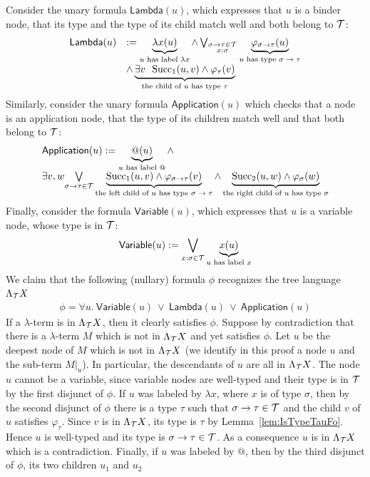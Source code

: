 Consider the unary formula $\mathsf{Lambda}(u)$, which expresses that $u$ is a binder node, that its type and the type of its child match well and both belong to ${\mathcal T}$: 
$$\begin{array}{ll}
\mathsf{Lambda}(u) &:= \underbrace{\lambda x(u)}_{\substack{\text{$u$ has label $\lambda x$}}} \wedge\bigvee_{\substack{\sigma\rightarrow\tau \in {\mathcal T}\\x:\sigma}}  \underbrace{\varphi_{\sigma\rightarrow\tau}(u)}_{\substack{\text{$u$ has type $\sigma\rightarrow\tau$}}}  \\ & \wedge \underbrace{\exists v\ \ \mathrm{Succ}_1(u, v) \wedge \varphi_\tau (v)}_{\substack{\text{the child of $u$ has type $\tau$}}}
\end{array}$$
Similarly, consider the unary formula $\mathsf{Application}(u)$ which checks that a node is an application node, that the type of its children match well and that both belong to ${\mathcal T}$: 
$$\begin{array}{l}
\mathsf{Application}(u) := \underbrace{@(u)}_{\substack{\text{$u$ has label @}}} \wedge \\ \exists v, w \underset{\sigma\rightarrow\tau \in {\mathcal T}}{\bigvee}  \underbrace{\mathrm{Succ}_1(u, v) \wedge \varphi_{\sigma\rightarrow\tau} (v)}_{\substack{\text{the left child of $u$ has type $\sigma\rightarrow\tau$}}} \wedge \underbrace{\mathrm{Succ}_2(u, w) \wedge \varphi_{\sigma} (w)}_{\substack{\text{the right child of $u$ has type $\sigma$}}}
\end{array}$$
Finally, consider the formula $\mathsf{Variable}(u)$, which expresses that $u$ is a variable node, whose type is in ${\mathcal T}$:
\begin{align*}
\mathsf{Variable}(u) :=  \bigvee_{x:\sigma\in {\mathcal T}}\underbrace{x(u)}_{\substack{\text{$u$ has label $x$}}} 
\end{align*}  
We claim that the following (nullary) formula $\phi$ recognizes the tree language $\Lambda_{{\mathcal T}} X$
\begin{align*}
\phi = \forall u.\ \mathsf{Variable}(u)\ \vee\ \mathsf{Lambda}(u)\ \vee\  \mathsf{Application}(u)
\end{align*}
If a $\lambda$-term is in $\Lambda_{{\mathcal T}} X$, then it clearly satisfies $\phi$. Suppose by contradiction that there is a $\lambda$-term $M$ which is not in $\Lambda_{{\mathcal T}} X$ and yet satisfies $\phi$. Let $u$  be the deepest node of $M$ which is not in $\Lambda_{{\mathcal T}} X$ (we identify in this proof a node $u$ and the sub-term $M|_u$). In particular, the descendants of $u$ are all in $\Lambda_{{\mathcal T}} X$. The node $u$ cannot be a variable, since variable nodes are well-typed and their type is in ${\mathcal T}$ by the first disjunct of $\phi$.  If $u$ was labeled by $\lambda x$, where $x$ is of type $\sigma$, then by the second disjunct of $\phi$ there is a type $\tau$ such that $\sigma\rightarrow\tau\in {\mathcal T}$ and the child $v$ of $u$  satisfies $\varphi_\tau$. Since $v$ is in $\Lambda_{{\mathcal T}} X$, its type is $\tau$ by Lemma~\ref{lem:IsTypeTauFo}. Hence $u$ is well-typed and its type is $\sigma\rightarrow\tau\in {\mathcal T}$. As a consequence $u$ is in $\Lambda_{{\mathcal T}} X$ which is a contradiction.  Finally, if $u$ was labeled by $@$, then by the third disjunct of $\phi$, its two children $u_1$ and $u_2$
